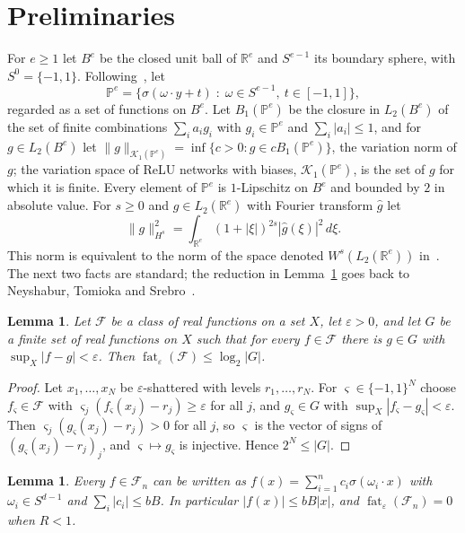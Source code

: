 \documentclass[11pt]{amsart}
\newtheorem{lemma}[theorem]{Lemma}
\theoremstyle{definition}
\theoremstyle{remark}
\numberwithin{equation}{section}
\newcommand{\RR}{\mathbb{R}}
\newcommand{\cF}{\mathcal{F}}
\newcommand{\cP}{\mathbb{P}}
\newcommand{\fat}{\operatorname{fat}}
\begin{document}
\section{Preliminaries}\label{sec:prelim}

For $e\ge1$ let $B^e$ be the closed unit ball of $\RR^e$ and $S^{e-1}$ its boundary sphere, with $S^0=\{-1,1\}$. Following~\cite{SX,MSX}, let
\[
\cP^e=\{\sigma(\omega\cdot y+t)\;:\;\omega\in S^{e-1},\ t\in[-1,1]\},
\]
regarded as a set of functions on $B^e$. Let $B_1(\cP^e)$ be the closure in $L_2(B^e)$ of the set of finite combinations $\sum_ia_ig_i$ with $g_i\in\cP^e$ and $\sum_i|a_i|\le1$, and for $g\in L_2(B^e)$ let $\|g\|_{\mathcal K_1(\cP^e)}=\inf\{c>0:g\in cB_1(\cP^e)\}$, the variation norm of $g$; the variation space of ReLU networks with biases, $\mathcal K_1(\cP^e)$, is the set of $g$ for which it is finite. Every element of $\cP^e$ is $1$-Lipschitz on $B^e$ and bounded by $2$ in absolute value. For $s\ge0$ and $g\in L_2(\RR^e)$ with Fourier transform $\hat g$ let
\[
\|g\|_{H^s}^2=\int_{\RR^e}(1+|\xi|)^{2s}|\hat g(\xi)|^2\,d\xi .
\]
This norm is equivalent to the norm of the space denoted $W^s(L_2(\RR^e))$ in~\cite{MSX}. The next two facts are standard; the reduction in Lemma~\ref{lem:reduce} goes back to Neyshabur, Tomioka and Srebro~\cite{NTS}.

\begin{lemma}\label{lem:cover}
Let $\cF$ be a class of real functions on a set $X$, let $\varepsilon>0$, and let $G$ be a finite set of real functions on $X$ such that for every $f\in\cF$ there is $g\in G$ with $\sup_X|f-g|<\varepsilon$. Then $\fat_\varepsilon(\cF)\le\log_2|G|$.
\end{lemma}

\begin{proof}
Let $x_1,\dots,x_N$ be $\varepsilon$-shattered with levels $r_1,\dots,r_N$. For $\varsigma\in\{-1,1\}^N$ choose $f_\varsigma\in\cF$ with $\varsigma_j(f_\varsigma(x_j)-r_j)\ge\varepsilon$ for all $j$, and $g_\varsigma\in G$ with $\sup_X|f_\varsigma-g_\varsigma|<\varepsilon$. Then $\varsigma_j(g_\varsigma(x_j)-r_j)>0$ for all $j$, so $\varsigma$ is the vector of signs of $(g_\varsigma(x_j)-r_j)_j$, and $\varsigma\mapsto g_\varsigma$ is injective. Hence $2^N\le|G|$.
\end{proof}

\begin{lemma}\label{lem:reduce}
Every $f\in\cF_n$ can be written as $f(x)=\sum_{i=1}^{n}c_i\sigma(\omega_i\cdot x)$ with $\omega_i\in S^{d-1}$ and $\sum_i|c_i|\le bB$. In particular $|f(x)|\le bB|x|$, and $\fat_\varepsilon(\cF_n)=0$ when $R<1$.
\end{lemma}
\end{document}
